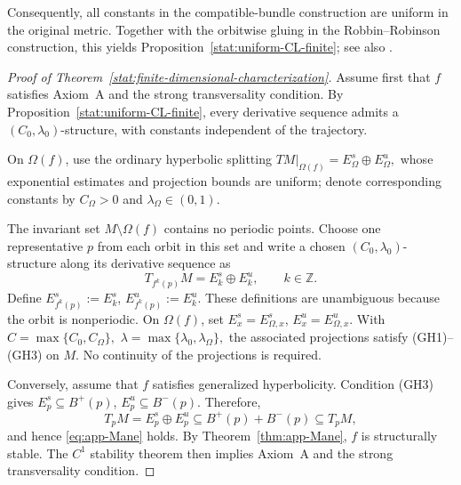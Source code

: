 \documentclass[12pt]{article}
\newcommand{\Zz}{\mathbb{Z}}
\theoremstyle{definition}
\begin{document}
Consequently, all constants in the compatible-bundle construction are
uniform in the original metric. Together with the orbitwise gluing in the
Robbin--Robinson construction, this yields
Proposition~\ref{stat:uniform-CL-finite}; see also
\cite[p.~277, after Definition~3]{PilCL}.

\begin{proof}[Proof of Theorem~\ref{stat:finite-dimensional-characterization}]
Assume first that $f$ satisfies Axiom~A and the strong transversality
condition. By Proposition~\ref{stat:uniform-CL-finite}, every derivative
sequence admits a $(C_0,\lambda_0)$-structure, with constants independent
of the trajectory.

On $\Omega(f)$, use the ordinary hyperbolic splitting
$
TM|_{\Omega(f)}=E_\Omega^s\oplus E_\Omega^u,
$
whose exponential estimates and projection bounds are uniform; denote
corresponding constants by $C_\Omega>0$ and
$\lambda_\Omega\in(0,1)$.

The invariant set $M\setminus\Omega(f)$ contains no periodic points.
Choose one representative $p$ from each orbit in this set and write a
chosen $(C_0,\lambda_0)$-structure along its derivative sequence as
\[
T_{f^k(p)}M=E_k^s\oplus E_k^u,\qquad k\in\Zz.
\]
Define
$
E_{f^k(p)}^s:=E_k^s$, $E_{f^k(p)}^u:=E_k^u.
$
These definitions are unambiguous because the orbit is nonperiodic. On $\Omega(f)$, set
$
E_x^s=E_{\Omega,x}^s$,
$
E_x^u=E_{\Omega,x}^u.
$
With
$
C=\max\{C_0,C_\Omega\},
$
$
\lambda=\max\{\lambda_0,\lambda_\Omega\},
$
the associated projections satisfy {\rm(GH1)}--{\rm(GH3)} on $M$.
No continuity of the projections is required.

Conversely, assume that $f$ satisfies generalized hyperbolicity.
Condition {\rm(GH3)} gives
$
E_p^s\subseteq B^+(p)$,
$E_p^u\subseteq B^-(p).
$
Therefore,
\[
T_pM=E_p^s\oplus E_p^u
\subseteq B^+(p)+B^-(p)
\subseteq T_pM,
\]
and hence \eqref{eq:app-Mane} holds. By
Theorem~\ref{thm:app-Mane}, $f$ is structurally stable. The $C^1$
stability theorem \cite{Mane1987} then implies Axiom~A and the strong
transversality condition.
\end{proof}
\end{document}
